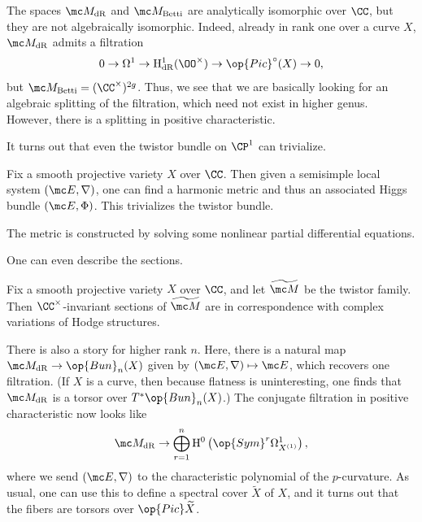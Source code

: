 \documentclass[../notes.tex]{subfiles}
\begin{document}
\begin{remark}
	The spaces $\mc M_{\mathrm{dR}}$ and $\mc M_{\mathrm{Betti}}$ are analytically isomorphic over $\CC$, but they are not algebraically isomorphic. Indeed, already in rank one over a curve $X$, $\mc M_{\mathrm{dR}}$ admits a filtration
	\[0\to\Omega^1\to\mathrm H^1_{\mathrm{dR}}(\OO^\times)\to\op{Pic}^\circ(X)\to0,\]
	but $\mc M_{\mathrm{Betti}}=(\CC^\times)^{2g}$. Thus, we see that we are basically looking for an algebraic splitting of the filtration, which need not exist in higher genus. However, there is a splitting in positive characteristic.
\end{remark}
It turns out that even the twistor bundle on $\CP^1$ can trivialize.
\begin{theorem}
	Fix a smooth projective variety $X$ over $\CC$. Then given a semisimple local system $(\mc E,\nabla)$, one can find a harmonic metric and thus an associated Higgs bundle $(\mc E,\Phi)$. This trivializes the twistor bundle.
\end{theorem}
\begin{remark}
	The metric is constructed by solving some nonlinear partial differential equations.
\end{remark}
One can even describe the sections.
\begin{theorem}[Simpson] \label{thm:simpson}
	Fix a smooth projective variety $X$ over $\CC$, and let $\widetilde{\mc M}$ be the twistor family. Then $\CC^\times$-invariant sections of $\widetilde{\mc M}$ are in correspondence with complex variations of Hodge structures.
\end{theorem}
\begin{remark}
	There is also a story for higher rank $n$. Here, there is a natural map $\mc M_{\mathrm{dR}}\to\op{Bun}_n(X)$ given by $(\mc E,\nabla)\mapsto\mc E$, which recovers one filtration. (If $X$ is a curve, then because flatness is uninteresting, one finds that $\mc M_{\mathrm{dR}}$ is a torsor over $T^*\op{Bun}_n(X)$.) The conjugate filtration in positive characteristic now looks like
	\[\mc M_{\mathrm{dR}}\to\bigoplus_{r=1}^n\mathrm H^0\left(\op{Sym}^r\Omega^1_{X^{(1)}}\right),\]
	where we send $(\mc E,\nabla)$ to the characteristic polynomial of the $p$-curvature. As usual, one can use this to define a spectral cover $\widetilde X$ of $X$, and it turns out that the fibers are torsors over $\op{Pic}\widetilde X$.
\end{remark}
\end{document}
